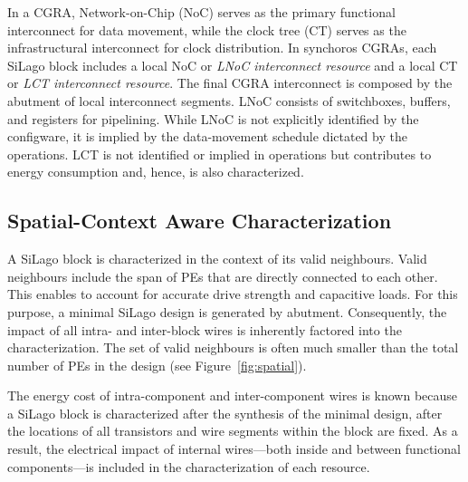 In a CGRA, Network-on-Chip (NoC) serves as the primary functional interconnect for data movement, while the clock tree (CT) serves as the infrastructural interconnect for clock distribution.
In synchoros CGRAs, each SiLago block includes a local NoC or \textit{LNoC interconnect resource} and a local CT or \textit{LCT interconnect resource}.
The final CGRA interconnect is composed by the abutment of local interconnect segments.
LNoC consists of switchboxes, buffers, and registers for pipelining. 
While LNoC is not explicitly identified by the configware, it is implied by the data-movement schedule dictated by the operations.
LCT is not identified or implied in operations but contributes to energy consumption and, hence, is also characterized.
\subsection{Spatial-Context Aware Characterization}
A SiLago block is characterized in the context of its valid neighbours.
Valid neighbours include the span of PEs that are directly connected to each other. 
This enables to account for accurate drive strength and capacitive loads. 
For this purpose, a minimal SiLago design is generated by abutment. 
Consequently, the impact of all intra- and inter-block wires is inherently factored into the characterization. 
The set of valid neighbours is often much smaller than the total number of PEs in the design (see Figure~\ref{fig:spatial}).

The energy cost of intra-component and inter-component wires is known because a SiLago block is characterized after the synthesis of the minimal design, after the locations of all transistors and wire segments within the block are fixed. 
As a result, the electrical impact of internal wires—both inside and between functional components—is included in the characterization of each resource.

